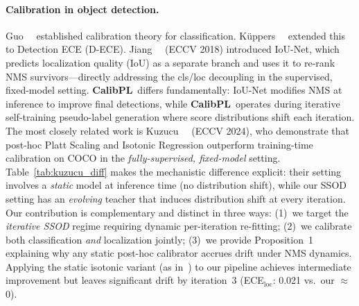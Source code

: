 \documentclass[10pt,twocolumn,letterpaper]{article}
\newcommand{\method}{\textbf{CalibPL}\xspace}
\begin{document}
\paragraph{Calibration in object detection.}
Guo~\etal~\cite{guo2017calibration} established calibration theory for
classification. K\"{u}ppers~\etal~\cite{kuppers2020detector} extended this to
Detection ECE (D-ECE). Jiang~\etal~\cite{iounet2018} (ECCV 2018) introduced
IoU-Net, which predicts localization quality (IoU) as a separate branch
and uses it to re-rank NMS survivors---directly addressing the cls/loc
decoupling in the supervised, fixed-model setting. \method\ differs fundamentally:
IoU-Net modifies NMS at inference to improve final detections, while \method\
operates during iterative self-training pseudo-label generation where score
distributions shift each iteration. The most closely related work is
Kuzucu~\etal~\cite{kuzucu2024calibration} (ECCV 2024), who demonstrate that
post-hoc Platt Scaling and Isotonic Regression outperform training-time
calibration on COCO in the \emph{fully-supervised, fixed-model} setting.
Table~\ref{tab:kuzucu_diff} makes the mechanistic difference explicit: their
setting involves a \emph{static} model at inference time (no distribution
shift), while our SSOD setting has an \emph{evolving} teacher that induces
distribution shift at every iteration. Our contribution is complementary and
distinct in three ways: (1)~we target the \emph{iterative SSOD} regime
requiring dynamic per-iteration re-fitting; (2)~we calibrate both
classification \emph{and} localization jointly; (3)~we provide Proposition~1
explaining why any static post-hoc calibrator accrues drift under NMS dynamics.
Applying the static isotonic variant (as in~\cite{kuzucu2024calibration})
to our pipeline achieves intermediate improvement but leaves significant drift
by iteration~3 (ECE$_\text{loc}$: 0.021 vs.\ our $\approx$0).
\end{document}
